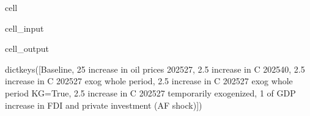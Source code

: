 \documentclass[letterpaper,10pt,english]{jupyterBook}
\begin{document}
\begin{sphinxuseclass}{cell}\begin{sphinxVerbatimInput}

\begin{sphinxuseclass}{cell_input}
\begin{sphinxVerbatim}[commandchars=\\\{\}]
\end{sphinxVerbatim}

\end{sphinxuseclass}\end{sphinxVerbatimInput}
\begin{sphinxVerbatimOutput}

\begin{sphinxuseclass}{cell_output}
\begin{sphinxVerbatim}[commandchars=\\\{\}]
dict\PYGZus{}keys([\PYGZsq{}Baseline\PYGZsq{}, \PYGZsq{}\PYGZdl{}25 increase in oil prices 2025\PYGZhy{}27\PYGZsq{}, \PYGZsq{}2.5\PYGZpc{} increase in C 2025\PYGZhy{}40\PYGZsq{}, \PYGZsq{}2.5\PYGZpc{} increase in C 2025\PYGZhy{}27 \PYGZhy{}\PYGZhy{} exog whole period\PYGZsq{}, \PYGZsq{}2.5\PYGZpc{} increase in C 2025\PYGZhy{}27 \PYGZhy{}\PYGZhy{} exog whole period \PYGZhy{}\PYGZhy{}KG=True\PYGZsq{}, \PYGZsq{}2.5\PYGZpc{} increase in C 2025\PYGZhy{}27 \PYGZhy{}\PYGZhy{} temporarily exogenized\PYGZsq{}, \PYGZsq{}1\PYGZpc{} of GDP increase in FDI and private investment (AF shock)\PYGZsq{}])
\end{sphinxVerbatim}

\end{sphinxuseclass}\end{sphinxVerbatimOutput}

\end{sphinxuseclass}
\end{document}
